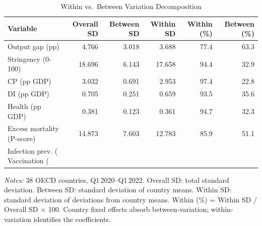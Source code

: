 \begin{table}[H]
\centering
\caption{Within vs.\ Between Variation Decomposition}
\label{tab:within_between}
\small
\renewcommand{\arraystretch}{1.15}
\begin{tabular}{@{} l r r r r r @{}}
\toprule
\textbf{Variable} & \textbf{Overall SD} & \textbf{Between SD} & \textbf{Within SD} & \textbf{Within (\%)} & \textbf{Between (\%)} \\
\midrule
Output gap (pp) & 4.766 & 3.018 & 3.688 & 77.4 & 63.3 \\
Stringency (0-100) & 18.696 & 6.143 & 17.658 & 94.4 & 32.9 \\
CP (pp GDP) & 3.032 & 0.691 & 2.953 & 97.4 & 22.8 \\
DI (pp GDP) & 0.705 & 0.251 & 0.659 & 93.5 & 35.6 \\
Health (pp GDP) & 0.381 & 0.123 & 0.361 & 94.7 & 32.3 \\
Excess mortality (P-score) & 14.873 & 7.603 & 12.783 & 85.9 & 51.1 \\
Infection prev. (%
Vaccination (%
\bottomrule
\end{tabular}
\vspace{4pt}

\parbox{\textwidth}{\footnotesize\textit{Notes:} 38 OECD countries, Q1\,2020--Q1\,2022. Overall SD: total standard deviation. Between SD: standard deviation of country means. Within SD: standard deviation of deviations from country means. Within (\%) = Within SD / Overall SD $\times$ 100. Country fixed effects absorb between-variation; within-variation identifies the coefficients.}
\end{table}

